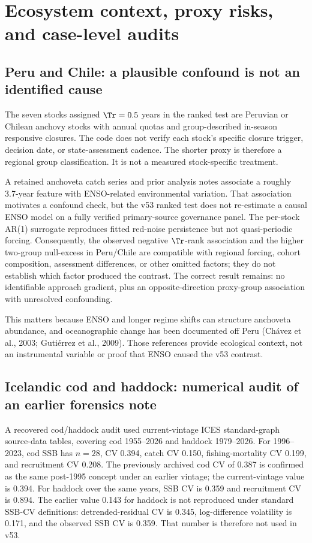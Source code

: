 \section{Ecosystem context, proxy risks, and case-level audits}\label{si:context}

\subsection{Peru and Chile: a plausible confound is not an identified cause}

The seven stocks assigned \(\Tr=0.5\) years in the ranked test are Peruvian or Chilean anchovy stocks with annual quotas and group-described in-season responsive closures. The code does not verify each stock's specific closure trigger, decision date, or state-assessment cadence. The shorter proxy is therefore a regional group classification. It is not a measured stock-specific treatment.

A retained anchoveta catch series and prior analysis notes associate a roughly 3.7-year feature with ENSO-related environmental variation. That association motivates a confound check, but the v53 ranked test does not re-estimate a causal ENSO model on a fully verified primary-source governance panel. The per-stock AR(1) surrogate reproduces fitted red-noise persistence but not quasi-periodic forcing. Consequently, the observed negative \(\Tr\)-rank association and the higher two-group null-excess in Peru/Chile are compatible with regional forcing, cohort composition, assessment differences, or other omitted factors; they do not establish which factor produced the contrast. The correct result remains: no identifiable approach gradient, plus an opposite-direction proxy-group association with unresolved confounding.

This matters because ENSO and longer regime shifts can structure anchoveta abundance, and oceanographic change has been documented off Peru (Ch\'avez et al., 2003; Guti\'errez et al., 2009). Those references provide ecological context, not an instrumental variable or proof that ENSO caused the v53 contrast.

\subsection{Icelandic cod and haddock: numerical audit of an earlier forensics note}

A recovered cod/haddock audit used current-vintage ICES standard-graph source-data tables, covering cod 1955--2026 and haddock 1979--2026. For 1996--2023, cod SSB has \(n=28\), CV 0.394, catch CV 0.150, fishing-mortality CV 0.199, and recruitment CV 0.208. The previously archived cod CV of 0.387 is confirmed as the same post-1995 concept under an earlier vintage; the current-vintage value is 0.394. For haddock over the same years, SSB CV is 0.359 and recruitment CV is 0.894. The earlier value 0.143 for haddock is not reproduced under standard SSB-CV definitions: detrended-residual CV is 0.345, log-difference volatility is 0.171, and the observed SSB CV is 0.359. That number is therefore not used in v53.

